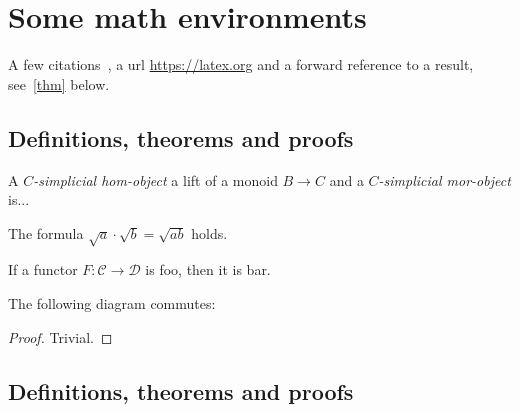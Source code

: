 \chapter{Some math environments}

\lipsum[5]

A few citations~\cite{SGA1,LaTeX}, a url \url{https://latex.org} and a forward
reference to a result, see~\cref{thm} below.

\section{Definitions, theorems and proofs}

\begin{definition}
  A \emph{\(C\)-simplicial hom-object} a lift of a monoid \(B \to C\) and a
  \emph{\(C\)-simplicial mor-object} is...
\end{definition}

\begin{lemma}
  The formula \(\sqrt a \cdot \sqrt b = \sqrt{ab}\) holds.
\end{lemma}

\begin{proposition}
  If a functor \(F : \mathcal C \to \mathcal D\) is foo, then it is bar.
\end{proposition}

\lipsum[1]

\begin{theorem}
  The following diagram commutes:
  \begin{center}
  \end{center}
\end{theorem}
\begin{proof}
  Trivial.
\end{proof}

\section{Definitions, theorems and proofs}

\lipsum[4]

